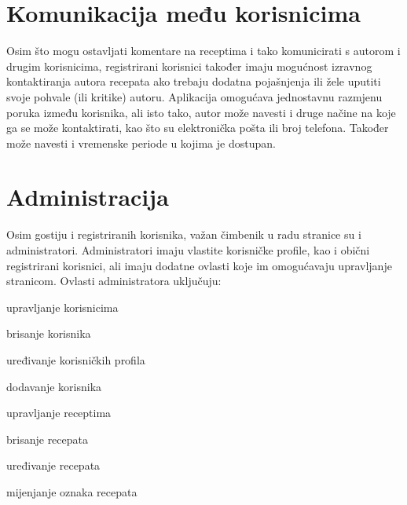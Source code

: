 		\section{Komunikacija među korisnicima}
		Osim što mogu ostavljati komentare na receptima i tako komunicirati s autorom i drugim korisnicima, registrirani korisnici također imaju mogućnost izravnog kontaktiranja autora recepata ako trebaju dodatna pojašnjenja ili žele uputiti svoje pohvale (ili kritike) autoru. Aplikacija omogućava jednostavnu razmjenu poruka između korisnika, ali isto tako, autor može navesti i druge načine na koje ga se može kontaktirati, kao što su elektronička pošta ili broj telefona. Također može navesti i vremenske periode u kojima je dostupan.
		\section{Administracija}
		Osim gostiju i registriranih korisnika, važan čimbenik u radu stranice su i administratori. Administratori imaju vlastite korisničke profile, kao i obični registrirani korisnici, ali imaju dodatne ovlasti koje im omogućavaju upravljanje stranicom.
		\linebreak
		Ovlasti administratora uključuju:
		\begin{packed_item}
			\item upravljanje korisnicima
			\item[] \begin{packed_item}
					\item brisanje korisnika
					\item uređivanje korisničkih profila
					\item dodavanje korisnika
					\end{packed_item}
			\item upravljanje receptima
			\item[] \begin{packed_item}
					\item brisanje recepata
					\item uređivanje recepata
					\item mijenjanje oznaka recepata
					\end{packed_item}
		\end{packed_item}
		
	